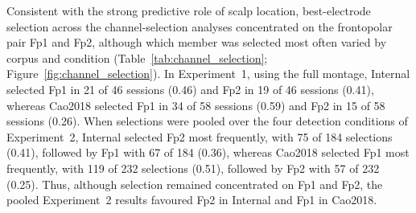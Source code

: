 Consistent with the strong predictive role of scalp location, best-electrode selection across the channel-selection analyses concentrated on the frontopolar pair Fp1 and Fp2, although which member was selected most often varied by corpus and condition (Table~\ref{tab:channel_selection}; Figure~\ref{fig:channel_selection}). In Experiment~1, using the full montage, Internal selected Fp1 in 21 of 46 sessions (0.46) and Fp2 in 19 of 46 sessions (0.41), whereas Cao2018 selected Fp1 in 34 of 58 sessions (0.59) and Fp2 in 15 of 58 sessions (0.26). When selections were pooled over the four detection conditions of Experiment~2, Internal selected Fp2 most frequently, with 75 of 184 selections (0.41), followed by Fp1 with 67 of 184 (0.36), whereas Cao2018 selected Fp1 most frequently, with 119 of 232 selections (0.51), followed by Fp2 with 57 of 232 (0.25). Thus, although selection remained concentrated on Fp1 and Fp2, the pooled Experiment~2 results favoured Fp2 in Internal and Fp1 in Cao2018.
